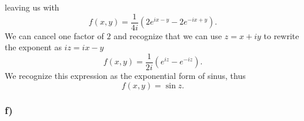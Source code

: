 \documentclass[12pt,twoside]{article}
\begin{document}
leaving us with
\begin{equation}
  f(x, y) = \frac{1}{4i}\left(2e^{ix-y} - 2e^{-ix+y}\right).
\end{equation}
We can cancel one factor of $2$ and recognize that we can use $z=x+iy$ to rewrite the exponent as $iz=ix-y$
\begin{equation}
  f(x, y) = \frac{1}{2i}\left(e^{iz} - e^{-iz}\right).
\end{equation}
We recognize this expression as the exponential form of sinus, thus
\begin{equation}
  f(x, y) = \sin{z}.
\end{equation}

\subsubsection*{f)}
%
%
\end{document}
